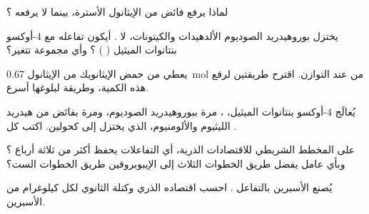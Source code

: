 \begin{exercise}[$\star$]\label{exo:g12:synthesis-strategy:4}
لماذا يرفع فائض من الإيثانول  الأسترة، بينما
لا يرفعه ؟
\end{exercise}

\begin{exercise}[$\star$]\label{exo:g12:synthesis-strategy:5}
يختزل بوروهيدريد الصوديوم الألدهيدات والكيتونات، لا . أيكون
تفاعله مع 4-أوكسو بنتانوات الميثيل ( )
؟ وأي مجموعة تتغير؟
\end{exercise}

\begin{exercise}[$\star\star$]\label{exo:g12:synthesis-strategy:6}
يعطي  من حمض الإيثانويك  من الإيثانول \qty{0.67}{mol} من
 عند التوازن. اقترح طريقتين لرفع هذه الكمية، وطريقة
لبلوغها أسرع.
\end{exercise}

\begin{exercise}[$\star\star$]\label{exo:g12:synthesis-strategy:7}
يُعالَج 4-أوكسو بنتانوات الميثيل، ، مرة
ببوروهيدريد الصوديوم، ومرة بفائض من هيدريد الليثيوم
والألومنيوم، الذي يختزل  إلى كحولين. اكتب كل .
\end{exercise}

\begin{exercise}[$\star\star$]\label{exo:g12:synthesis-strategy:8}
على المخطط الشريطي للاقتصادات الذرية، أي التفاعلات يحفظ أكثر من ثلاثة
أرباع ؟ وبأي عامل يفضل طريق الخطوات الثلاث إلى
الإيبوبروفين طريق الخطوات الست؟
\end{exercise}

\begin{exercise}[$\star\star$]\label{exo:g12:synthesis-strategy:9}
يُصنع الأسبرين بالتفاعل . احسب
اقتصاده الذري وكتلة  الثانوي لكل كيلوغرام من الأسبرين.
\end{exercise}

